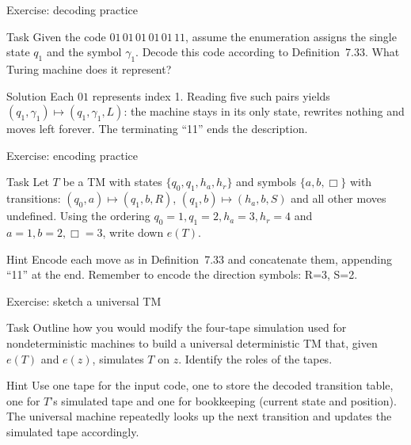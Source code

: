 \begin{frame}[t]{Exercise: decoding practice}
  \begin{tblock}{Task}
    Given the code $0 1\,0 1\,0 1\,0 1\,0 1\,11$, assume the
    enumeration assigns the single state $q_1$ and the symbol $\gamma_1$.
    Decode this code according to Definition 7.33.  What Turing
    machine does it represent?
  \end{tblock}
  \begin{talert}{Solution}
    Each $0 1$ represents index 1.  Reading five such pairs yields
    $(q_1,\gamma_1)\mapsto(q_1,\gamma_1,L)$: the machine stays in its
    only state, rewrites nothing and moves left forever.  The
    terminating “11” ends the description.
  \end{talert}
  \label{fr:7.8-10}
\end{frame}

\begin{frame}[t]{Exercise: encoding practice}
  \begin{tblock}{Task}
    Let $T$ be a TM with states $\{q_0,q_1,h_a,h_r\}$ and symbols
    $\{a,b,\Box\}$ with transitions: $(q_0,a)\mapsto(q_1,b,R)$,
    $(q_1,b)\mapsto(h_a,b,S)$ and all other moves undefined.  Using
    the ordering $q_0=1,q_1=2,h_a=3,h_r=4$ and $a=1,b=2,\Box=3$, write
    down $e(T)$.
  \end{tblock}
  \begin{talert}{Hint}
    Encode each move as in Definition 7.33 and concatenate them,
    appending “11” at the end.  Remember to encode the direction
    symbols: R=3, S=2.
  \end{talert}
  \label{fr:7.8-11}
\end{frame}

\begin{frame}[t]{Exercise: sketch a universal TM}
  \begin{tblock}{Task}
    Outline how you would modify the four‑tape simulation used for
    nondeterministic machines to build a universal deterministic TM
    that, given $e(T)$ and $e(z)$, simulates $T$ on $z$.  Identify the
    roles of the tapes.
  \end{tblock}
  \begin{talert}{Hint}
    Use one tape for the input code, one to store the decoded
    transition table, one for $T$’s simulated tape and one for
    bookkeeping (current state and position).  The universal machine
    repeatedly looks up the next transition and updates the simulated
    tape accordingly.
  \end{talert}
  \label{fr:7.8-12}
\end{frame}


